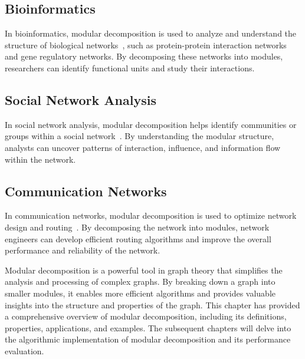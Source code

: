 \subsection*{Bioinformatics}\label{subsec:bioinformatics}

In bioinformatics, modular decomposition is used to analyze and understand the structure of biological networks~\cite{MDPPIN}, such as protein-protein interaction networks and gene regulatory networks.
By decomposing these networks into modules, researchers can identify functional units and study their interactions.

\subsection*{Social Network Analysis}\label{subsec:social-network-analysis}

In social network analysis, modular decomposition helps identify communities or groups within a social network~\cite{NCCD}.
By understanding the modular structure, analysts can uncover patterns of interaction, influence, and information flow within the network.

\subsection*{Communication Networks}\label{subsec:communication-networks}

In communication networks, modular decomposition is used to optimize network design and routing~\cite{MANTP}.
By decomposing the network into modules, network engineers can develop efficient routing algorithms and improve the overall performance and reliability of the network.


\hspace{4cm}

Modular decomposition is a powerful tool in graph theory that simplifies the analysis and processing of complex graphs.
By breaking down a graph into smaller modules, it enables more efficient algorithms and provides valuable insights into the structure and properties of the graph.
This chapter has provided a comprehensive overview of modular decomposition, including its definitions, properties, applications, and examples.
The subsequent chapters will delve into the algorithmic implementation of modular decomposition and its performance evaluation.

